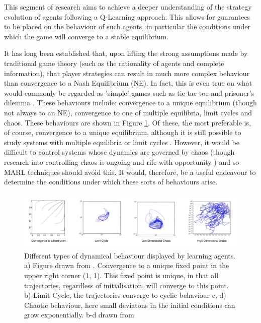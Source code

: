 \documentclass[.../main.tex]{subfiles}
\begin{document}
    This segment of research aims to achieve a deeper understanding
    of the strategy evolution of agents following a Q-Learning
    approach. This allows for guarantees to be placed on the behaviour
    of such agents, in particular the conditions under which the game
    will converge to a stable equilibrium.

    It has long been established that, upon lifting the strong
    assumptions made by traditional game theory (such as the
    rationality of agents and complete information), that player
    strategies can result in much more complex behaviour than
    convergence to a Nash Equilibrium (NE). In fact, this is even true
    on what would commonly be regarded as 'simple' games such as
    tic-tac-toe and prisoner's dilemma \cite{Galla2011,
      Sato2002}. These behaviours include: convergence to a unique
    equilibrium (though not always to an NE), convergence to one of
    multiple equilibria, limit cycles and chaos. These behaviours are
    shown in Figure \ref{fig::DynamicalBehaviours}. Of these, the most
    preferable is, of course, convergence to a unique equilibrium,
    although it is still possible to study systems with multiple
    equilibria or limit cycles \cite{Strogatz2000}. However, it would
    be difficult to control systems whose dynamics are governed by
    chaos (though research into controlling chaos is ongoing and rife
    with opportunity \cite{Fradkov2009}) and so MARL techniques should
    avoid this. It would, therefore, be a useful endeavour to
    determine the conditions under which these sorts of behaviours
    arise.

    \begin{figure}[h]
        \centering
        \includegraphics[width=1.1\textwidth]{Figures/DynamicalBehaviours}
        \caption{ \label{fig::DynamicalBehaviours} Different types of dynamical behaviour
       displayed
        by learning agents. a) Figure drawn from \cite{Tuyls2006AnGames}.
        Convergence
        to a unique fixed point in the upper right corner (1, 1). This fixed point is unique, in
        that all trajectories, regardless of initialisation, will converge to this point. b) Limit Cycle, the trajectories converge to cyclic behaviour c,
        d) Chaotic behaviour, here small deviatons in the initial conditions can grow
        exponentially. b-d drawn from \cite{Sanders2018}}
    \end{figure}
\end{document}
